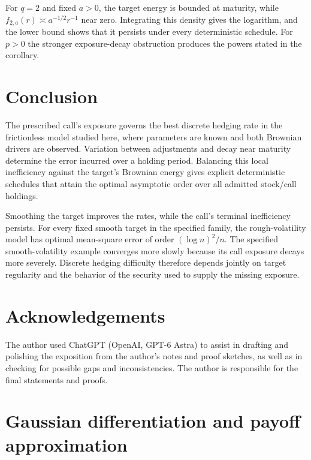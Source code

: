 \documentclass[11pt,a4paper]{amsart}
\theoremstyle{plain}
\theoremstyle{definition}
\theoremstyle{remark}
\begin{document}
For $q=2$ and fixed $a>0$, the target energy is bounded at maturity, while $f_{2,a}(r)\asymp a^{-1/2}r^{-1}$ near zero. Integrating this density gives the logarithm, and the lower bound shows that it persists under every deterministic schedule. For $p>0$ the stronger exposure-decay obstruction produces the powers stated in the corollary.

\section{Conclusion}

The prescribed call's exposure governs the best discrete hedging rate in the frictionless model studied here, where parameters are known and both Brownian drivers are observed. Variation between adjustments and decay near maturity determine the error incurred over a holding period. Balancing this local inefficiency against the target's Brownian energy gives explicit deterministic schedules that attain the optimal asymptotic order over all admitted stock/call holdings.

Smoothing the target improves the rates, while the call's terminal inefficiency persists. For every fixed smooth target in the specified family, the rough-volatility model has optimal mean-square error of order $(\log n)^2/n$. The specified smooth-volatility example converges more slowly because its call exposure decays more severely. Discrete hedging difficulty therefore depends jointly on target regularity and the behavior of the security used to supply the missing exposure.

\section*{Acknowledgements}

The author used ChatGPT (OpenAI, GPT-6 Astra) to assist in drafting and
polishing the exposition from the author's notes and proof sketches, as well
as in checking for possible gaps and inconsistencies. The author is
responsible for the final statements and proofs.

\appendix

\section{Gaussian differentiation and payoff approximation}\label{app:closure}
\end{document}
